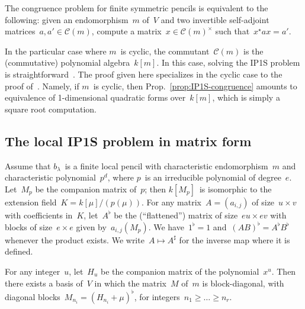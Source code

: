 \documentclass{lms}%
\let\ro\mathscr
\begin{document}
\begin{prop}\label{prop:IP1S-congruence}
The congruence problem for finite symmetric pencils is equivalent to the
following: given an endomorphism~$m$ of~$V$ and two invertible
self-adjoint matrices~$a, a' ∈ \ro C(m)$, compute a matrix~$x ∈ \ro
C(m)^{×}$ such that~$x^{⋆} a x = a'$.
\end{prop}

In the particular case where $m$~is cyclic, the commutant~$\ro C(m)$ is
the (commutative) polynomial algebra~$k[m]$. In this case, solving the
IP1S problem is straightforward~\cite{MPG2013}. The proof given here
specializes in the cyclic case to the proof of~\cite{MPG2013}. Namely, if
$m$~is cyclic, then Prop.~\ref{prop:IP1S-congruence} amounts to
equivalence of 1-dimensional quadratic forms over~$k[m]$, which is simply
a square root computation.

\subsection{The local IP1S problem in matrix form}%

Assume that $b_{λ}$~is a finite local pencil with characteristic
endomorphism~$m$ and characteristic polynomial~$p^d$, where $p$~is an
irreducible polynomial of degree~$e$. Let~$M_p$ be the companion matrix
of~$p$; then $k[M_p]$~is isomorphic to the extension field~$K =
k[μ]/(p(μ))$. For any matrix~$A = (a_{i,j})$ of size~$u × v$ with
coefficients in~$K$, let~$A^{♭}$ be the (``flattened'') matrix of
size~$eu × ev$ with blocks of size~$e × e$ given by~$a_{i,j}(M_p)$. We
have~$1^{♭} = 1$ and~$(AB)^{♭} = A^{♭} B^{♭}$ whenever the product
exists. We write~$A ↦ A^{♯}$ for the inverse map where it is defined.

For any integer~$u$, let~$H_u$ be the companion matrix of the
polynomial~$x^u$. Then there exists a basis of~$V$ in which the
matrix~$M$ of~$m$ is block-diagonal, with diagonal blocks~$M_{n_i} =
(H_{n_i} + μ)^{♭}$, for integers~$n_1 ≥ … ≥ n_r$.
\end{document}

